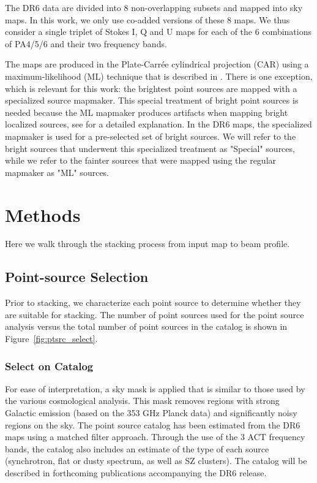 The DR6 data are divided into 8 non-overlapping subsets and mapped into sky maps. In this work, we only use co-added versions of these 8 maps. We thus consider a single triplet of Stokes I, Q and U maps for each of the 6 combinations of PA4/5/6 and their two frequency bands. 

The maps are produced in the Plate-Carr\'{e}e cylindrical projection (CAR) using a maximum-likelihood (ML) technique that is described in \cite{aiola_2020}. There is one exception, which is relevant for this work: the brightest point sources are mapped with a specialized source mapmaker. This special treatment of bright point sources is needed because the ML mapmaker produces artifacts when mapping bright localized sources, see \cite{naess_2019} for a detailed explanation. In the DR6 maps, the specialized mapmaker is used for a pre-selected set of bright sources. We will refer to the bright sources that underwent this specialized treatment as "Special" sources, while we refer to the fainter sources that were mapped using the regular mapmaker as "ML" sources.

\section{Methods}
\label{sec:stack}
Here we walk through the stacking process from input map to beam profile.  

\subsection{Point-source Selection}
\label{subsec:ptsrc_sel}
Prior to stacking, we characterize each point source to determine whether they are suitable for stacking.  The number of point sources used for the point source analysis versus the total number of point sources in the catalog is shown in Figure~\ref{fig:ptsrc_select}.

\subsubsection{Select on Catalog}
\label{subsubsec:cat_sel}
For ease of interpretation, a sky mask is applied that is similar to those used by the various cosmological analysis. This mask removes regions with strong Galactic emission (based on the 353 GHz Planck data) and significantly noisy regions on the sky.  The point source catalog has been estimated from the DR6 maps using a matched filter approach. Through the use of the 3 ACT frequency bands, the catalog also includes an estimate of the type of each source (synchrotron, flat or dusty spectrum, as well as SZ clusters). The catalog will be described in forthcoming publications accompanying the DR6 release.

